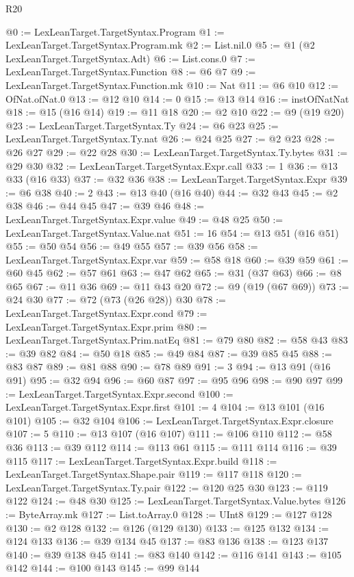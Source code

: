 \begin{lexlean}{R20}
\begin{coremodule}
@0 := LexLeanTarget.TargetSyntax.Program
@1 := LexLeanTarget.TargetSyntax.Program.mk
@2 := List.nil.{0}
@5 := @1 (@2 LexLeanTarget.TargetSyntax.Adt)
@6 := List.cons.{0}
@7 := LexLeanTarget.TargetSyntax.Function
@8 := @6 @7
@9 := LexLeanTarget.TargetSyntax.Function.mk
@10 := Nat
@11 := @6 @10
@12 := OfNat.ofNat.{0}
@13 := @12 @10
@14 := 0
@15 := @13 @14
@16 := instOfNatNat
@18 := @15 (@16 @14)
@19 := @11 @18
@20 := @2 @10
@22 := @9 (@19 @20)
@23 := LexLeanTarget.TargetSyntax.Ty
@24 := @6 @23
@25 := LexLeanTarget.TargetSyntax.Ty.nat
@26 := @24 @25
@27 := @2 @23
@28 := @26 @27
@29 := @22 @28
@30 := LexLeanTarget.TargetSyntax.Ty.bytes
@31 := @29 @30
@32 := LexLeanTarget.TargetSyntax.Expr.call
@33 := 1
@36 := @13 @33 (@16 @33)
@37 := @32 @36
@38 := LexLeanTarget.TargetSyntax.Expr
@39 := @6 @38
@40 := 2
@43 := @13 @40 (@16 @40)
@44 := @32 @43
@45 := @2 @38
@46 := @44 @45
@47 := @39 @46
@48 := LexLeanTarget.TargetSyntax.Expr.value
@49 := @48 @25
@50 := LexLeanTarget.TargetSyntax.Value.nat
@51 := 16
@54 := @13 @51 (@16 @51)
@55 := @50 @54
@56 := @49 @55
@57 := @39 @56
@58 := LexLeanTarget.TargetSyntax.Expr.var
@59 := @58 @18
@60 := @39 @59
@61 := @60 @45
@62 := @57 @61
@63 := @47 @62
@65 := @31 (@37 @63)
@66 := @8 @65
@67 := @11 @36
@69 := @11 @43 @20
@72 := @9 (@19 (@67 @69))
@73 := @24 @30
@77 := @72 (@73 (@26 @28)) @30
@78 := LexLeanTarget.TargetSyntax.Expr.cond
@79 := LexLeanTarget.TargetSyntax.Expr.prim
@80 := LexLeanTarget.TargetSyntax.Prim.natEq
@81 := @79 @80
@82 := @58 @43
@83 := @39 @82
@84 := @50 @18
@85 := @49 @84
@87 := @39 @85 @45
@88 := @83 @87
@89 := @81 @88
@90 := @78 @89
@91 := 3
@94 := @13 @91 (@16 @91)
@95 := @32 @94
@96 := @60 @87
@97 := @95 @96
@98 := @90 @97
@99 := LexLeanTarget.TargetSyntax.Expr.second
@100 := LexLeanTarget.TargetSyntax.Expr.first
@101 := 4
@104 := @13 @101 (@16 @101)
@105 := @32 @104
@106 := LexLeanTarget.TargetSyntax.Expr.closure
@107 := 5
@110 := @13 @107 (@16 @107)
@111 := @106 @110
@112 := @58 @36
@113 := @39 @112
@114 := @113 @61
@115 := @111 @114
@116 := @39 @115
@117 := LexLeanTarget.TargetSyntax.Expr.build
@118 := LexLeanTarget.TargetSyntax.Shape.pair
@119 := @117 @118
@120 := LexLeanTarget.TargetSyntax.Ty.pair
@122 := @120 @25 @30
@123 := @119 @122
@124 := @48 @30
@125 := LexLeanTarget.TargetSyntax.Value.bytes
@126 := ByteArray.mk
@127 := List.toArray.{0}
@128 := UInt8
@129 := @127 @128
@130 := @2 @128
@132 := @126 (@129 @130)
@133 := @125 @132
@134 := @124 @133
@136 := @39 @134 @45
@137 := @83 @136
@138 := @123 @137
@140 := @39 @138 @45
@141 := @83 @140
@142 := @116 @141
@143 := @105 @142
@144 := @100 @143
@145 := @99 @144

\end{coremodule}
\end{lexlean}
